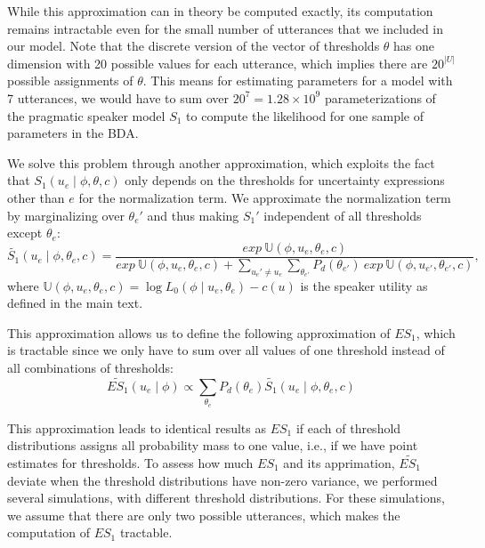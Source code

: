 \documentclass[man, floatsintext]{apa6}
\begin{document}
While this approximation can in theory be computed exactly, its computation remains intractable even 
for the small number of utterances that we included in our model. Note that the discrete version of the
vector of thresholds $\theta$ has one dimension with 20 possible values for each utterance, which implies
there are $20^{|U|}$ possible assignments of $\theta$. This means for estimating parameters for 
a model with 7 utterances, we would have to sum over $20^{7}=1.28 \times 10^9$ 
parameterizations of the pragmatic speaker model $S_1$ to compute the likelihood for one 
sample of parameters in the BDA. 

We solve this problem through another approximation, which exploits the fact that 
$S_1(u _e \mid \phi, \theta, c)$ only depends on the thresholds for uncertainty
expressions other than $e$ for the normalization term. We approximate the normalization term by 
marginalizing over $\theta_e'$ and thus making $S_1'$ independent of all thresholds except $\theta_e$:
$$\widetilde{S_1}(u_e \mid \phi, \theta_e, c) = \frac{exp \ \mathbb{U}(\phi, u_e, \theta_e, c) } { exp \ \mathbb{U}(\phi, u_e, \theta_e, c) + 
\sum_{u_e' \ne u_e}{ \sum_{\theta_{e'}} P_d(\theta_{e'}) \  exp \ \mathbb{U}(\phi, u_{e'}, \theta_{e'}, c) } }, $$
where $\mathbb{U}(\phi, u_e, \theta_e, c) = \log L_0(\phi \mid u_e, \theta_e) - c(u) $ is the speaker utility as defined in the main text.

This approximation allows us to define the following approximation of $ES_1$, which is tractable since we only have to sum over
all values of one threshold instead of all combinations of thresholds:
$$\widetilde{ES_1}(u_e \mid \phi) \propto  \sum_{\theta_e} P_{d}(\theta_e) \widetilde{S_1}\left(u _e\mid \phi, \theta_e, c\right)$$

This approximation leads to identical results as $ES_1$ if each of threshold distributions assigns all probability mass to one value, 
i.e., if we have point estimates for thresholds. To assess how much $ES_1$ and its apprimation, $\widetilde{ES_1}$ deviate when 
the threshold distributions have non-zero variance, we performed several simulations, with different threshold distributions. For these
simulations, we assume that there are only two possible utterances, which makes the computation of $ES_1$ tractable.
\end{document}
